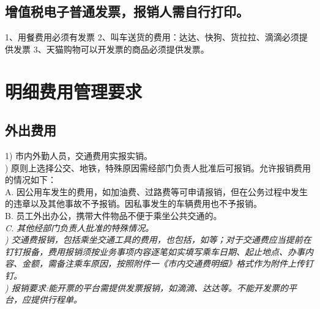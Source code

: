 \documentclass[]{article}
\begin{document}
\subsection{增值税电子普通发票，报销人需自行打印。}
1、用餐费用必须有发票
2、叫车送货的费用：达达、快狗、货拉拉、滴滴必须提供发票
3、天猫购物可以开发票的商品必须提供发票。

\section{明细费用管理要求}
\subsection{外出费用}
1)	市内外勤人员，交通费用实报实销。\\)	原则上选择公交、地铁，特殊原因需经部门负责人批准后可报销。允许报销费用的情况如下：\\\indent
A.	因公用车发生的费用，如加油费、过路费等可申请报销，但在公务过程中发生的违章以及其他事故不予报销。因私事发生的车辆费用也不予报销。\\\indent
B.	员工外出办公，携带大件物品不便于乘坐公共交通的。\\\indent\em
C.	其他经部门负责人批准的特殊情况。\\)	交通费报销，包括乘坐交通工具的费用，也包括，如等；对于交通费应当提前在钉钉报备，费用报销须按业务事项内容逐笔如实填写乘车日期、起止地点、办事内容、金额，需备注乘车原因，按照附件一《市内交通费明细》格式作为附件上传钉钉。\\)  报销要求:能开票的平台需提供发票报销，如滴滴、达达等。不能开发票的平台，应提供行程单。

\end{document}
